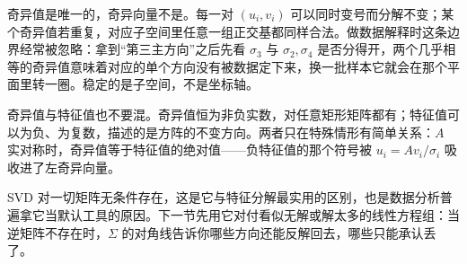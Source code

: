 奇异值是唯一的，奇异向量不是。每一对 \((u_i,v_i)\) 可以同时变号而分解不变；某个奇异值若重复，对应子空间里任意一组正交基都同样合法。做数据解释时这条边界经常被忽略：拿到``第三主方向''之后先看 \(\sigma_3\) 与 \(\sigma_2,\sigma_4\) 是否分得开，两个几乎相等的奇异值意味着对应的单个方向没有被数据定下来，换一批样本它就会在那个平面里转一圈。稳定的是子空间，不是坐标轴。

奇异值与特征值也不要混。奇异值恒为非负实数，对任意矩形矩阵都有；特征值可以为负、为复数，描述的是方阵的不变方向。两者只在特殊情形有简单关系：\(A\) 实对称时，奇异值等于特征值的绝对值——负特征值的那个符号被 \(u_i=Av_i/\sigma_i\) 吸收进了左奇异向量。

SVD 对一切矩阵无条件存在，这是它与特征分解最实用的区别，也是数据分析普遍拿它当默认工具的原因。下一节先用它对付看似无解或解太多的线性方程组：当逆矩阵不存在时，\(\Sigma\) 的对角线告诉你哪些方向还能反解回去，哪些只能承认丢了。

